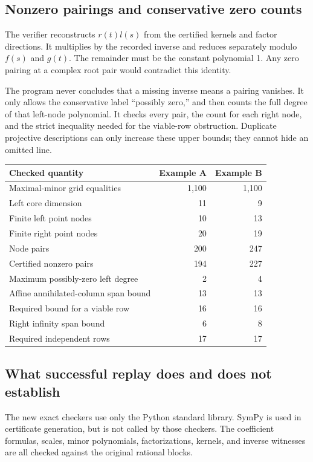 \documentclass[11pt]{article}
\theoremstyle{definition}\newtheorem{definition}[theorem]{Definition}
\begin{document}
\subsection{Nonzero pairings and conservative zero counts}
The verifier reconstructs $r(t)l(s)$ from the certified kernels and factor directions. It multiplies by the recorded inverse and reduces separately modulo $f(s)$ and $g(t)$. The remainder must be the constant polynomial 1. Any zero pairing at a complex root pair would contradict this identity.

The program never concludes that a missing inverse means a pairing vanishes. It only allows the conservative label ``possibly zero,'' and then counts the full degree of that left-node polynomial. It checks every pair, the count for each right node, and the strict inequality needed for the viable-row obstruction. Duplicate projective descriptions can only increase these upper bounds; they cannot hide an omitted line.

\begin{center}
\begin{tabular}{@{}lrr@{}}\toprule
Checked quantity & Example A & Example B\\\midrule
Maximal-minor grid equalities & 1,100 & 1,100\\
Left core dimension & 11 & 9\\
Finite left point nodes & 10 & 13\\
Finite right point nodes & 20 & 19\\
Node pairs & 200 & 247\\
Certified nonzero pairs & 194 & 227\\
Maximum possibly-zero left degree & 2 & 4\\
Affine annihilated-column span bound & 13 & 13\\
Required bound for a viable row & 16 & 16\\
Right infinity span bound & 6 & 8\\
Required independent rows & 17 & 17\\\bottomrule
\end{tabular}
\end{center}

\subsection{What successful replay does and does not establish}
The new exact checkers use only the Python standard library. SymPy is used in certificate generation, but is not called by those checkers. The coefficient formulas, scales, minor polynomials, factorizations, kernels, and inverse witnesses are all checked against the original rational blocks.
\end{document}

